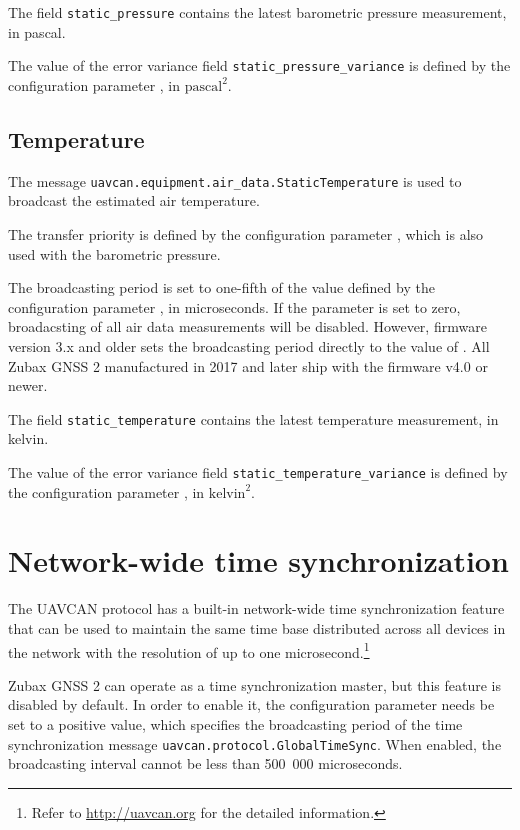 \documentclass{zubaxdoc}
\begin{document}
The field \verb|static_pressure| contains the latest barometric pressure measurement, in pascal.

The value of the error variance field \verb|static_pressure_variance| is defined by the configuration
parameter , in $\text{pascal}^2$.

\subsection{Temperature}

The message \verb|uavcan.equipment.air_data.StaticTemperature| is used to broadcast the
estimated air temperature.

The transfer priority is defined by the configuration parameter ,
which is also used with the barometric pressure.

The broadcasting period is set to one-fifth of the value defined by the configuration
parameter , in microseconds.
If the parameter is set to zero, broadacsting of all air data measurements will be disabled.
However, firmware version 3.x and older sets the broadcasting period directly to the value
of .
All Zubax GNSS 2 manufactured in 2017 and later ship with the firmware v4.0 or newer.

The field \verb|static_temperature| contains the latest temperature measurement, in kelvin.

The value of the error variance field \verb|static_temperature_variance| is defined by the configuration
parameter , in $\text{kelvin}^2$.

\section{Network-wide time synchronization}

The UAVCAN protocol has a built-in network-wide time synchronization feature
that can be used to maintain the same time base distributed across all devices in the network
with the resolution of up to one
microsecond.\footnote{Refer to \url{http://uavcan.org} for the detailed information.}

Zubax GNSS 2 can operate as a time synchronization master, but this feature is disabled by default.
In order to enable it, the configuration parameter  needs be set to a
positive value, which specifies the broadcasting period of the time synchronization message
\verb|uavcan.protocol.GlobalTimeSync|.
When enabled, the broadcasting interval cannot be less than 500~000 microseconds.
\end{document}
